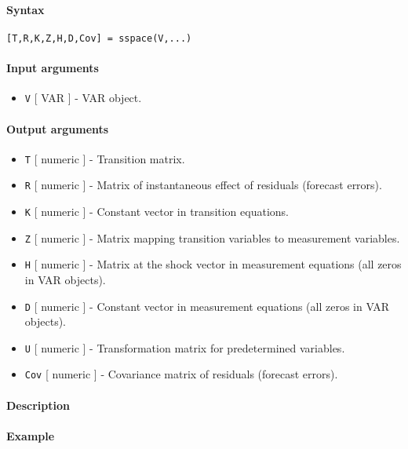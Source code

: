 


	\paragraph{Syntax}

\begin{verbatim}
[T,R,K,Z,H,D,Cov] = sspace(V,...)
\end{verbatim}

\paragraph{Input arguments}

\begin{itemize}
\itemsep1pt\parskip0pt
\item
  \texttt{V} {[} VAR {]} - VAR object.
\end{itemize}

\paragraph{Output arguments}

\begin{itemize}
\item
  \texttt{T} {[} numeric {]} - Transition matrix.
\item
  \texttt{R} {[} numeric {]} - Matrix of instantaneous effect of
  residuals (forecast errors).
\item
  \texttt{K} {[} numeric {]} - Constant vector in transition equations.
\item
  \texttt{Z} {[} numeric {]} - Matrix mapping transition variables to
  measurement variables.
\item
  \texttt{H} {[} numeric {]} - Matrix at the shock vector in measurement
  equations (all zeros in VAR objects).
\item
  \texttt{D} {[} numeric {]} - Constant vector in measurement equations
  (all zeros in VAR objects).
\item
  \texttt{U} {[} numeric {]} - Transformation matrix for predetermined
  variables.
\item
  \texttt{Cov} {[} numeric {]} - Covariance matrix of residuals
  (forecast errors).
\end{itemize}

\paragraph{Description}

\paragraph{Example}


